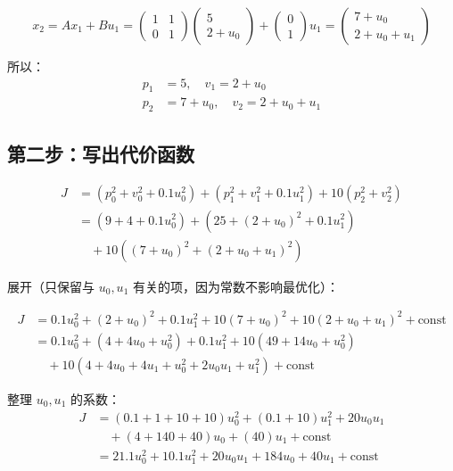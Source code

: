 \[
x_2 = A x_1 + B u_1 = \begin{pmatrix} 1 & 1 \\ 0 & 1 \end{pmatrix} \begin{pmatrix} 5 \\ 2 + u_0 \end{pmatrix} + \begin{pmatrix} 0 \\ 1 \end{pmatrix} u_1 = \begin{pmatrix} 7 + u_0 \\ 2 + u_0 + u_1 \end{pmatrix}
\]

所以：
\begin{align}
p_1 &= 5, \quad v_1 = 2 + u_0 \\
p_2 &= 7 + u_0, \quad v_2 = 2 + u_0 + u_1
\end{align}

\subsection{第二步：写出代价函数}

\begin{align}
J &= (p_0^2 + v_0^2 + 0.1 u_0^2) + (p_1^2 + v_1^2 + 0.1 u_1^2) + 10(p_2^2 + v_2^2) \\
&= (9 + 4 + 0.1 u_0^2) + (25 + (2+u_0)^2 + 0.1 u_1^2) \nonumber \\
&\quad + 10((7+u_0)^2 + (2+u_0+u_1)^2)
\end{align}

展开（只保留与 $u_0, u_1$ 有关的项，因为常数不影响最优化）：

\begin{align}
J &= 0.1 u_0^2 + (2+u_0)^2 + 0.1 u_1^2 + 10(7+u_0)^2 + 10(2+u_0+u_1)^2 + \text{const} \\
&= 0.1 u_0^2 + (4 + 4u_0 + u_0^2) + 0.1 u_1^2 + 10(49 + 14u_0 + u_0^2) \\
&\quad + 10(4 + 4u_0 + 4u_1 + u_0^2 + 2u_0 u_1 + u_1^2) + \text{const}
\end{align}

整理 $u_0, u_1$ 的系数：
\begin{align}
J &= (0.1 + 1 + 10 + 10) u_0^2 + (0.1 + 10) u_1^2 + 20 u_0 u_1 \\
&\quad + (4 + 140 + 40) u_0 + (40) u_1 + \text{const} \\
&= 21.1 u_0^2 + 10.1 u_1^2 + 20 u_0 u_1 + 184 u_0 + 40 u_1 + \text{const}
\end{align}

